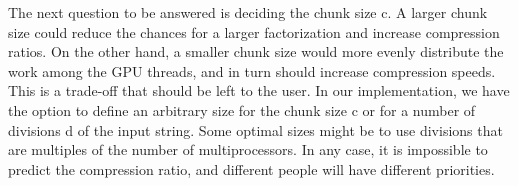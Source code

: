 %
%

The next question to be answered is deciding the chunk size c. 
A larger chunk size could reduce the chances for a larger factorization and increase compression ratios.
On the other hand, a smaller chunk size would more evenly distribute the work among the GPU threads, and in turn should increase compression speeds.
This is a trade-off that should be left to the user.
In our implementation, we have the option to define an arbitrary size for the chunk size c or for a number of divisions d of the input string.
Some optimal sizes might be to use divisions that are multiples of the number of multiprocessors.
In any case, it is impossible to predict the compression ratio, and different people will have different priorities.


